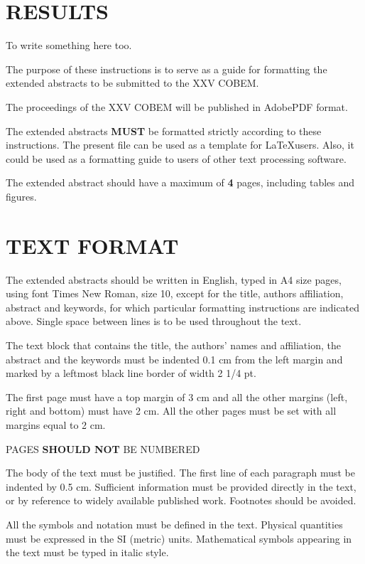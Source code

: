 \documentclass[10pt,fleqn,a4paper,twoside]{article}
\begin{document}
\section{RESULTS}

To write something here too.

The purpose of these instructions is to serve as a guide for formatting the extended abstracts to be submitted to the XXV COBEM.

The proceedings of the XXV COBEM will be published in Adobe\texttrademark\space PDF format.

The extended abstracts {\bf MUST} be formatted strictly according to these instructions. The present file can be used as a template for \LaTeX\space users. Also, it could be used as a formatting guide to users of other text processing software.

The extended abstract should have a maximum of {\bf 4} pages, including tables and figures.

\section{TEXT FORMAT}

The extended abstracts should be written in English, typed in A4 size pages, using font Times New Roman, size 10, except for the title, authors affiliation, abstract and keywords, for which particular formatting instructions are indicated above. Single space between lines is to be used throughout the text.

The text block that contains the title, the authors' names and affiliation, the abstract and the keywords must be indented 0.1 cm from the left margin and marked by a leftmost black line border of width 2 1/4 pt.

The first page must have a top margin of 3 cm and all the other margins (left, right and bottom) must have 2 cm. All the other pages must be set with all margins equal to 2 cm.

PAGES {\bf SHOULD NOT} BE NUMBERED

The body of the text must be justified. The first line of each paragraph must be indented by 0.5 cm. Sufficient information must be provided directly in the text, or by reference to widely available published work. Footnotes should be avoided.

All the symbols and notation must be defined in the text. Physical quantities must be expressed in the SI (metric) units. Mathematical symbols appearing in the text must be typed in italic style.
\end{document}
